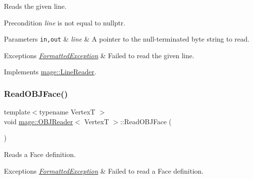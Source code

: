 Reads the given line.

\begin{DoxyPrecond}{Precondition}
{\itshape line} is not equal to {\ttfamily nullptr}. 
\end{DoxyPrecond}

\begin{DoxyParams}[1]{Parameters}
\mbox{\tt in,out}  & {\em line} & A pointer to the null-\/terminated byte string to read. \\
\hline
\end{DoxyParams}

\begin{DoxyExceptions}{Exceptions}
{\em \hyperlink{classmage_1_1_formatted_exception}{Formatted\+Exception}} & Failed to read the given line. \\
\hline
\end{DoxyExceptions}


Implements \hyperlink{classmage_1_1_line_reader_acfb2f7279ec77d070a86d7db812d4745}{mage\+::\+Line\+Reader}.

\hypertarget{classmage_1_1_o_b_j_reader_a647cd7683007f351096702924ce46a3b}{}\label{classmage_1_1_o_b_j_reader_a647cd7683007f351096702924ce46a3b} 
\subsubsection{\texorpdfstring{Read\+O\+B\+J\+Face()}{ReadOBJFace()}}
{\footnotesize\ttfamily template$<$typename VertexT $>$ \\
void \hyperlink{classmage_1_1_o_b_j_reader}{mage\+::\+O\+B\+J\+Reader}$<$ VertexT $>$\+::Read\+O\+B\+J\+Face (\begin{DoxyParamCaption}{ }\end{DoxyParamCaption})\hspace{0.3cm}{\ttfamily [private]}}

Reads a Face definition.


\begin{DoxyExceptions}{Exceptions}
{\em \hyperlink{classmage_1_1_formatted_exception}{Formatted\+Exception}} & Failed to read a Face definition. \\
\hline
\end{DoxyExceptions}
\hypertarget{classmage_1_1_o_b_j_reader_a8159620b12d426073581202fee022662}{}\label{classmage_1_1_o_b_j_reader_a8159620b12d426073581202fee022662} 
